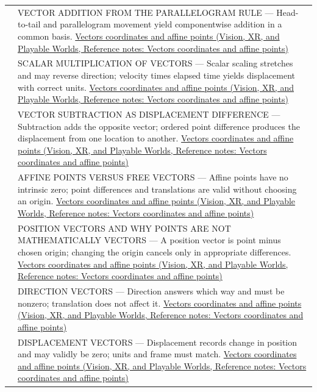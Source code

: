 {\begin{longtable}[]{@{}
  >{\raggedright\arraybackslash}p{}
  >{\raggedright\arraybackslash}p{}@{}}
518 & VECTOR ADDITION FROM THE PARALLELOGRAM RULE --- Head-to-tail and parallelogram movement yield componentwise addition in a common basis. \href{../07-Vision-XR-and-Playable-Worlds/main.pdf\#nameddest=appendix-0659864c0aa3}{Vectors coordinates and affine points (Vision, XR, and Playable Worlds, Reference notes: Vectors coordinates and affine points)} \\
519 & SCALAR MULTIPLICATION OF VECTORS --- Scalar scaling stretches and may reverse direction; velocity times elapsed time yields displacement with correct units. \href{../07-Vision-XR-and-Playable-Worlds/main.pdf\#nameddest=appendix-0659864c0aa3}{Vectors coordinates and affine points (Vision, XR, and Playable Worlds, Reference notes: Vectors coordinates and affine points)} \\
520 & VECTOR SUBTRACTION AS DISPLACEMENT DIFFERENCE --- Subtraction adds the opposite vector; ordered point difference produces the displacement from one location to another. \href{../07-Vision-XR-and-Playable-Worlds/main.pdf\#nameddest=appendix-0659864c0aa3}{Vectors coordinates and affine points (Vision, XR, and Playable Worlds, Reference notes: Vectors coordinates and affine points)} \\
521 & AFFINE POINTS VERSUS FREE VECTORS --- Affine points have no intrinsic zero; point differences and translations are valid without choosing an origin. \href{../07-Vision-XR-and-Playable-Worlds/main.pdf\#nameddest=appendix-0659864c0aa3}{Vectors coordinates and affine points (Vision, XR, and Playable Worlds, Reference notes: Vectors coordinates and affine points)} \\
522 & POSITION VECTORS AND WHY POINTS ARE NOT MATHEMATICALLY VECTORS --- A position vector is point minus chosen origin; changing the origin cancels only in appropriate differences. \href{../07-Vision-XR-and-Playable-Worlds/main.pdf\#nameddest=appendix-0659864c0aa3}{Vectors coordinates and affine points (Vision, XR, and Playable Worlds, Reference notes: Vectors coordinates and affine points)} \\
523 & DIRECTION VECTORS --- Direction answers which way and must be nonzero; translation does not affect it. \href{../07-Vision-XR-and-Playable-Worlds/main.pdf\#nameddest=appendix-0659864c0aa3}{Vectors coordinates and affine points (Vision, XR, and Playable Worlds, Reference notes: Vectors coordinates and affine points)} \\
524 & DISPLACEMENT VECTORS --- Displacement records change in position and may validly be zero; units and frame must match. \href{../07-Vision-XR-and-Playable-Worlds/main.pdf\#nameddest=appendix-0659864c0aa3}{Vectors coordinates and affine points (Vision, XR, and Playable Worlds, Reference notes: Vectors coordinates and affine points)} \\

\end{longtable}}
